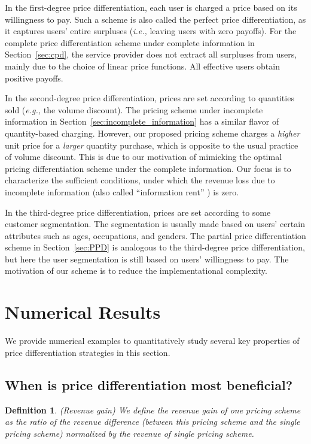 \documentclass[twocolumn,10pt,twosided]{IEEEtran}
\newtheorem{definition}{Definition}
\newcommand{\eg}{\emph{e.g., }}
\newcommand{\ie}{\emph{i.e., }}
\begin{document}
In the first-degree price differentiation, each user is charged a price based on its willingness to pay. Such a scheme is also called the perfect price differentiation, as it captures users' entire surpluses (\ie leaving users with zero payoffs). For the complete price differentiation scheme under complete information in Section~\ref{sec:cpd}, the service provider does not extract all surpluses from users, mainly due to the choice of linear price functions. All effective users obtain positive payoffs.

In the second-degree price differentiation, prices are set according to quantities sold (\eg the volume discount). The pricing scheme under incomplete information in Section~\ref{sec:incomplete_information} has a similar flavor of quantity-based charging. However, our proposed pricing scheme charges a \emph{higher} unit price for a \emph{larger} quantity purchase, which is opposite to the usual practice of volume discount. This is due to our motivation of mimicking the optimal pricing differentiation scheme under the complete information. Our focus is to characterize the sufficient conditions, under which the revenue loss due to incomplete information (also called ``information rent'' \cite{mussa1978monopoly, stokey1979intertemporal, maskin1984monopoly,mas1995microeconomic}) is zero.

In the third-degree price differentiation, prices are set according to some customer segmentation. The segmentation is usually made based on users' certain attributes such as  ages, occupations, and genders. The partial price differentiation scheme in Section~\ref{sec:PPD} is analogous to the third-degree price differentiation, but here the user segmentation is still based on users' willingness to pay. The motivation of our scheme is to reduce the implementational complexity.




\section{Numerical Results}
We provide numerical examples to quantitatively study several key properties of
price differentiation strategies in this section.
\subsection{When is price differentiation most beneficial?}
\begin{definition}
(Revenue gain) We define the revenue gain  of one pricing scheme as the ratio of the revenue difference (between this pricing scheme and the single pricing scheme) normalized by  the revenue of single pricing scheme.
\end{definition}
\end{document}
